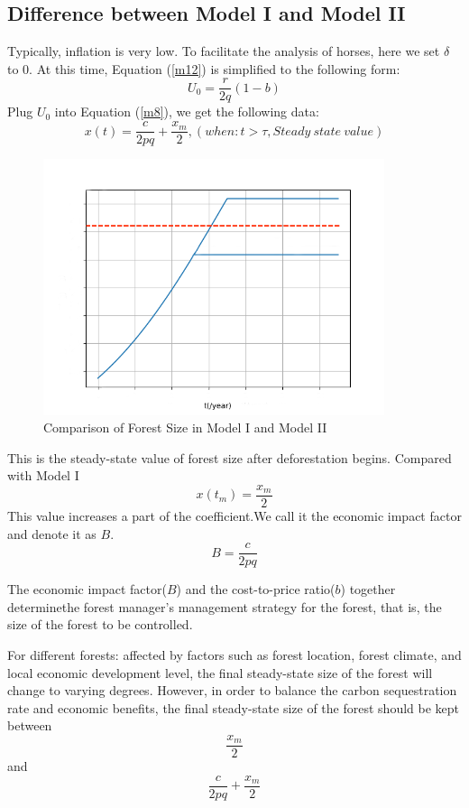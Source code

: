 \documentclass[12pt]{article}
\begin{document}
\subsection{Difference between Model I and Model II}
Typically, inflation is very low. To facilitate the analysis of horses, here we
set $\delta$ to 0. At this time, Equation (\ref{m12}) is simplified to the
following form:
\begin{equation}
    U_0=\frac{r}{2q}(1-b) \label{A1}
\end{equation}
Plug $U_0$ into Equation (\ref{m8}), we get the following data:
\begin{equation}
    x(t)=\frac{c}{2pq}+\frac{x_m}{2},(when:t>\tau,Steady\ state\ value)
\end{equation}
\begin{figure}[htb]
    \centering
    \includegraphics[width=10cm]{compare.png}
    \caption{Comparison of Forest Size in Model I and Model II}
\end{figure}
This is the steady-state value of forest size after deforestation begins.
Compared with Model I
\[x(t_m)=\frac{x_m}{2}\]
This value increases a part of the coefficient.We call it the economic impact
factor and denote it as $B$.
\[B=\frac{c}{2pq}\]

The economic impact factor($B$) and the cost-to-price ratio($b$) together
determinethe forest manager's management strategy for the forest, that is, the
size of the forest to be controlled.

For different forests: affected by factors such as forest location, forest
climate, and local economic development level, the final steady-state size of
the forest will change to varying degrees. However, in order to balance the
carbon sequestration rate and economic benefits, the final steady-state size of
the forest should be kept between
\[\frac{x_m}{2}\]
and
\[\frac{c}{2pq}+\frac{x_m}{2}\]
\end{document}
